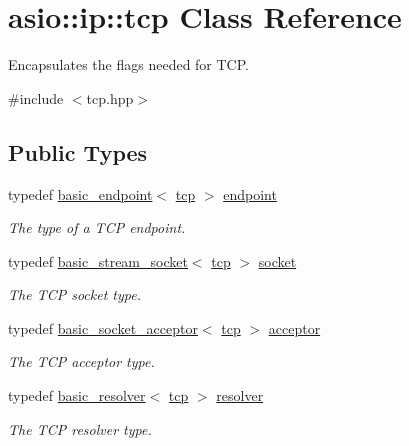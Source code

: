 \hypertarget{classasio_1_1ip_1_1tcp}{}\section{asio\+:\+:ip\+:\+:tcp Class Reference}
\label{classasio_1_1ip_1_1tcp}


Encapsulates the flags needed for T\+C\+P.  




{\ttfamily \#include $<$tcp.\+hpp$>$}

\subsection*{Public Types}
\begin{DoxyCompactItemize}
\item 
typedef \hyperlink{classasio_1_1ip_1_1basic__endpoint}{basic\+\_\+endpoint}$<$ \hyperlink{classasio_1_1ip_1_1tcp}{tcp} $>$ \hyperlink{classasio_1_1ip_1_1tcp_ad8c036bc6e1ae9b77b3beca871933de2}{endpoint}
\begin{DoxyCompactList}\small\item\em The type of a T\+C\+P endpoint. \end{DoxyCompactList}\item 
typedef \hyperlink{classasio_1_1basic__stream__socket}{basic\+\_\+stream\+\_\+socket}$<$ \hyperlink{classasio_1_1ip_1_1tcp}{tcp} $>$ \hyperlink{classasio_1_1ip_1_1tcp_a6f5bf95251747bb81d75784387938d6a}{socket}
\begin{DoxyCompactList}\small\item\em The T\+C\+P socket type. \end{DoxyCompactList}\item 
typedef \hyperlink{classasio_1_1basic__socket__acceptor}{basic\+\_\+socket\+\_\+acceptor}$<$ \hyperlink{classasio_1_1ip_1_1tcp}{tcp} $>$ \hyperlink{classasio_1_1ip_1_1tcp_a09a6c28b61af7d9d7680c03ba5062f67}{acceptor}
\begin{DoxyCompactList}\small\item\em The T\+C\+P acceptor type. \end{DoxyCompactList}\item 
typedef \hyperlink{classasio_1_1ip_1_1basic__resolver}{basic\+\_\+resolver}$<$ \hyperlink{classasio_1_1ip_1_1tcp}{tcp} $>$ \hyperlink{classasio_1_1ip_1_1tcp_a5e41beb40a92f3bde7563645c2fe5f6c}{resolver}
\begin{DoxyCompactList}\small\item\em The T\+C\+P resolver type. \end{DoxyCompactList}\item 

\end{DoxyCompactItemize}
